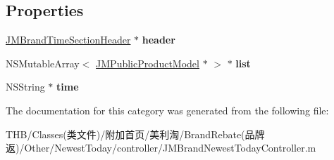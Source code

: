 \subsection*{Properties}
\begin{DoxyCompactItemize}
\item 
\mbox{\label{category_j_m_brand_newest_today_controller_07_08_a6d90af9e5b29f6d4ae06144ad844439a}} 
\mbox{\hyperlink{interface_j_m_brand_time_section_header}{J\+M\+Brand\+Time\+Section\+Header}} $\ast$ {\bfseries header}
\item 
\mbox{\label{category_j_m_brand_newest_today_controller_07_08_a39e01e91bb04af415b0c2a1d1034fb0d}} 
N\+S\+Mutable\+Array$<$ \mbox{\hyperlink{interface_j_m_public_product_model}{J\+M\+Public\+Product\+Model}} $\ast$ $>$ $\ast$ {\bfseries list}
\item 
\mbox{\label{category_j_m_brand_newest_today_controller_07_08_aacb5fd2e95b853983585669eaf681436}} 
N\+S\+String $\ast$ {\bfseries time}
\end{DoxyCompactItemize}


The documentation for this category was generated from the following file\+:\begin{DoxyCompactItemize}
\item 
T\+H\+B/\+Classes(类文件)/附加首页/美利淘/\+Brand\+Rebate(品牌返)/\+Other/\+Newest\+Today/controller/J\+M\+Brand\+Newest\+Today\+Controller.\+m\end{DoxyCompactItemize}
